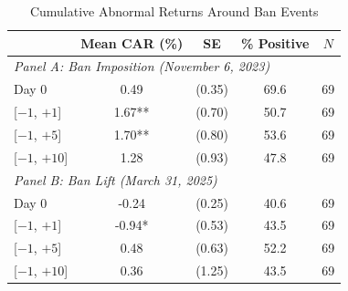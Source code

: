 \begin{table}[t]
\centering
\caption{Cumulative Abnormal Returns Around Ban Events}
\label{tab:event_study}
\small
\begin{tabular}{lcccc}
\hline\hline
 & Mean CAR (\%) & SE & \% Positive & $N$ \\
\hline
\multicolumn{5}{l}{\textit{Panel A: Ban Imposition (November 6, 2023)}} \\
Day 0 & 0.49 & (0.35) & 69.6 & 69 \\
{}[$-1$, $+1$] & 1.67** & (0.70) & 50.7 & 69 \\
{}[$-1$, $+5$] & 1.70** & (0.80) & 53.6 & 69 \\
{}[$-1$, $+10$] & 1.28 & (0.93) & 47.8 & 69 \\
\hline
\multicolumn{5}{l}{\textit{Panel B: Ban Lift (March 31, 2025)}} \\
Day 0 & -0.24 & (0.25) & 40.6 & 69 \\
{}[$-1$, $+1$] & -0.94* & (0.53) & 43.5 & 69 \\
{}[$-1$, $+5$] & 0.48 & (0.63) & 52.2 & 69 \\
{}[$-1$, $+10$] & 0.36 & (1.25) & 43.5 & 69 \\
\hline\hline
\end{tabular}
\par{}
\end{table}
